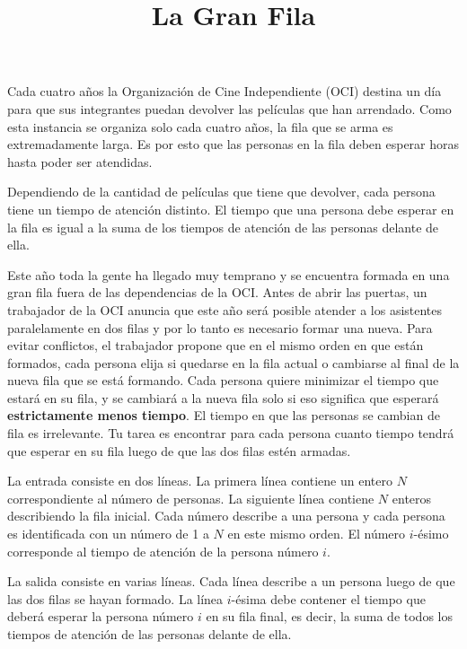 \documentclass{oci}
\title{La Gran Fila}
\begin{document}
\maketitle

Cada cuatro años la Organización de Cine Independiente (OCI) destina un día para que sus integrantes puedan devolver las películas que han arrendado.
Como esta instancia se organiza solo cada cuatro años, la fila que se arma es extremadamente larga.
Es por esto que las personas en la fila deben esperar horas hasta poder ser atendidas.

Dependiendo de la cantidad de películas que tiene que devolver, cada persona tiene un tiempo de atención distinto.
El tiempo que una persona debe esperar en la fila es igual a la suma de los tiempos de atención de las personas delante de ella.

Este año toda la gente ha llegado muy temprano y se encuentra formada en una gran fila fuera de las dependencias de la OCI.
Antes de abrir las puertas, un trabajador de la OCI anuncia que este año será posible atender a los asistentes paralelamente en dos filas y por lo tanto es necesario formar una nueva.
Para evitar conflictos, el trabajador propone que en el mismo orden en que están formados, cada persona elija si quedarse en la fila actual o cambiarse al final de la nueva fila que se está formando.
Cada persona quiere minimizar el tiempo que estará en su fila, y se cambiará a la nueva fila solo si eso significa que esperará {\bf estrictamente menos tiempo}.
El tiempo en que las personas se cambian de fila es irrelevante.
Tu tarea es encontrar para cada persona cuanto tiempo tendrá que esperar en su fila luego de que las dos filas estén armadas.

\begin{inputDescription}
  La entrada consiste en dos líneas.
La primera línea contiene un entero $N$ correspondiente al número de personas.
La siguiente línea contiene $N$ enteros describiendo la fila inicial.
Cada número describe a una persona y cada persona es identificada con un número de 1 a $N$ en este mismo orden.
El número $i$-ésimo corresponde al tiempo de atención de la persona número $i$.
\end{inputDescription}

\begin{outputDescription}
  La salida consiste en varias líneas.
  Cada línea describe a un persona luego de que las dos filas se hayan formado.
  La línea $i$-ésima debe contener el tiempo que deberá esperar la persona número $i$ en su fila final, es decir, la suma de todos los tiempos de atención de las personas delante de ella.
\end{outputDescription}
\end{document}
